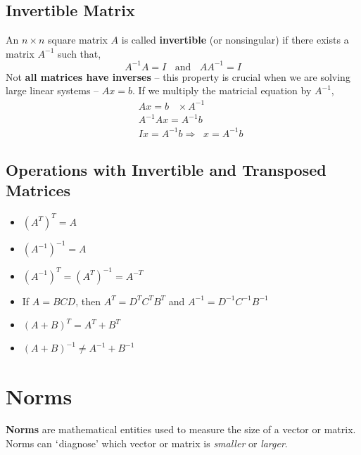 \documentclass[12pts,a4paper,amsmath,amssymb,floatfix]{article}%
\begin{document}
\subsection{Invertible Matrix}
An $n\times n$ square matrix $A$ is called {\bf invertible} (or nonsingular) if there exists a matrix $A^{-1}$ such that,
\begin{displaymath}
A^{-1}A = I \;\;\text{ and } \;\; AA^{-1}= I
\end{displaymath}
Not {\bf all matrices have inverses} -- this property is crucial when we are solving large linear systems -- $Ax=b$. If we multiply the matricial equation by $A^{-1}$,
\begin{eqnarray}
&& Ax=b \;\;\;\times A^{-1} \nonumber \\
&& A^{-1}Ax = A^{-1}b \nonumber \\
&& Ix = A^{-1}b \Longrightarrow \;\;x = A^{-1}b
\end{eqnarray}

\subsection{Operations with Invertible and Transposed Matrices}
\begin{itemize}
\item $\left(A^{T}\right)^{T} = A$
\item $\left(A^{-1}\right)^{-1} = A$
\item $\left(A^{-1}\right)^{T} = \left(A^{T}\right)^{-1} = A^{-T}$
\item If $A=BCD$, then $A^{T} = D^{T}C^{T}B^{T}$ and $A^{-1} = D^{-1}C^{-1}B^{-1}$
\item $\left(A+B\right)^{T} = A^{T} + B^{T}$
\item $\left(A+B\right)^{-1} \neq A^{-1} + B^{-1}$
\end{itemize}

\section{Norms}
{\bf Norms} are mathematical entities used to measure the size of a vector or matrix. Norms can $\lq$diagnose' which vector or matrix is {\it smaller} or {\it larger}.
\end{document}
